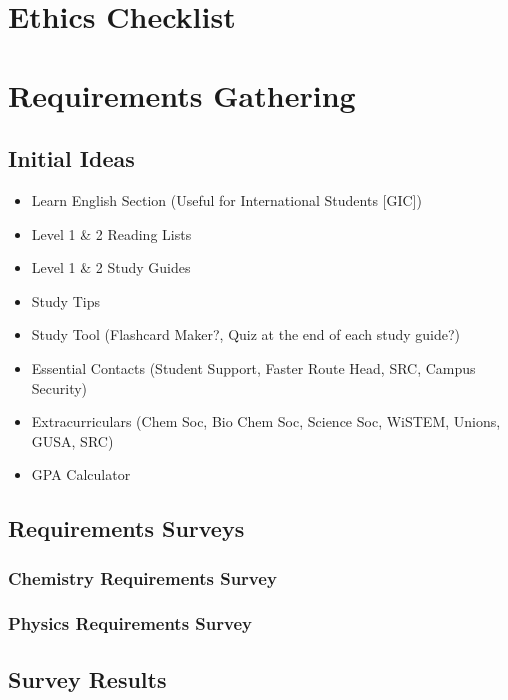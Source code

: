 \documentclass{l4proj}
\begin{document}
\begin{appendices}

\chapter{Ethics Checklist} \label{app:ethics}


\chapter{Requirements Gathering} \label{app:requirements}
\section{Initial Ideas} \label{app:initial}
\begin{itemize}
    \item Learn English Section (Useful for International Students [GIC])
    \item Level 1 \& 2 Reading Lists
    \item Level 1 \& 2 Study Guides
    \item Study Tips
    \item Study Tool (Flashcard Maker?,  Quiz at the end of each study guide?)
    \item Essential Contacts (Student Support,  Faster Route Head,  SRC,  Campus Security)
    \item Extracurriculars (Chem Soc, Bio Chem Soc,  Science Soc,  WiSTEM,  Unions,  GUSA,  SRC)
    \item GPA Calculator
\end{itemize}
\section{Requirements Surveys}
\subsection{Chemistry Requirements Survey} \label{app:cehmReqSurvey}


\subsection{Physics Requirements Survey} \label{app:physReqSurvey}


\section{Survey Results}

\end{appendices}
\end{document}

